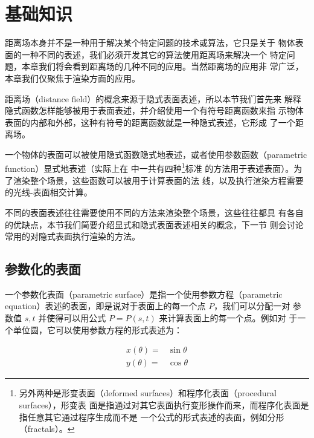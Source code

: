 \section{基础知识}
距离场本身并不是一种用于解决某个特定问题的技术或算法，它只是关于 物体表面的一种不同的表述，我们必须开发其它的算法使用距离场来解决一个 特定问题，本章我们将会看到距离场的几种不同的应用。当然距离场的应用非 常广泛\cite{a:3d-distance-fields-a-survey}，本章我们仅聚焦于渲染方面的应用。

距离场（distance field）的概念来源于隐式表面表述，所以本节我们首先来 解释隐式函数怎样能够被用于表面表述，并介绍使用一个有符号距离函数来指 示物体表面的内部和外部，这种有符号的距离函数就是一种隐式表述，它形成 了一个距离场。

一个物体的表面可以被使用隐式函数隐式地表述，或者使用参数函数（parametric function）显式地表述（实际上在 \cite{b:AnIntegratedIntroductiontoCG}中一共有四种\footnote{另外两种是形变表面（deformed surfaces）和程序化表面（procedural surfaces），形变表 面是指通过对其它表面执行变形操作而来，而程序化表面是指任意其它通过程序生成而不是 一个公式的形式表述的表面，例如分形（fractals）。}标准 的方法用于表述表面）。为了渲染整个场景，这些函数可以被用于计算表面的法 线，以及执行渲染方程需要的光线-表面相交计算。

不同的表面表述往往需要使用不同的方法来渲染整个场景，这些往往都具 有各自的优缺点，本节我们简要介绍显式和隐式表面表述相关的概念，下一节 则会讨论常用的对隐式表面执行渲染的方法。



\subsection{参数化的表面}\label{sec:df-parametric-surface}
一个参数化表面（parametric surface）是指一个使用参数方程（parametric equation）表述的表面，即是说对于表面上的每一个点 $P$，我们可以分配一对 参数值 $s,t$ 并使得可以用公式 $P = P(s,t)$ 来计算表面上的每一个点。例如对 于一个单位圆，它可以使用参数方程的形式表述为：

\begin{equation}
	\begin{aligned}
		x(\theta)=&\sin \theta\\
		y(\theta)=&\cos \theta
	\end{aligned}
\end{equation}

